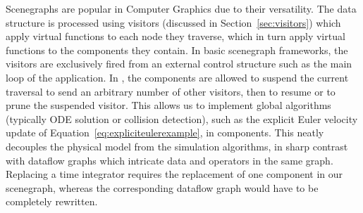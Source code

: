Scenegraphs are popular in Computer Graphics due to their versatility.
The data structure is processed using visitors (discussed in Section~\ref{sec:visitors}) which apply virtual functions to each node they traverse, which in turn apply virtual functions to the components they contain.
In basic scenegraph frameworks, the visitors are exclusively fired from an external control structure such as the main loop of the application.
In \sofa, the components are allowed to suspend the current traversal to send an arbitrary number of other visitors, then to resume or to prune the suspended visitor.
This allows us to implement global algorithms (typically ODE solution or collision detection), such as the explicit Euler velocity update of Equation~\ref{eq:expliciteulerexample}, in components.
This neatly decouples the physical model from the simulation algorithms, in sharp contrast with dataflow graphs which intricate data and operators in the same graph.
Replacing a time integrator requires the replacement of one component in our scenegraph, whereas the corresponding dataflow graph would have to be completely rewritten.




